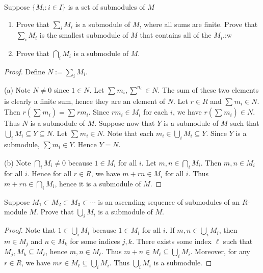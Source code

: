\documentclass[10pt,oneside,openany]{memoir}
\begin{document}
\begin{exercise}
	Suppose $\{M_i:i\in I\}$ is a set of submodules of $M$
	\mbox{}
	\begin{enumerate}[label = (\alph*),itemsep=1pt,topsep=3pt]
		\item Prove that $\sum_i M_i$ is a submodule of $M$, where all sums are finite. Prove that $\sum_i M_i$ is the smallest submodule of $M$ that contains all of the $M_i$.:w
		\item Prove that $\bigcap_i M_i$ is a submodule of $M$.
	\end{enumerate}
\end{exercise}
{\color{blue}

	\begin{proof}
		Define $N := \sum_{i}^{} M_i$.

		(a) Note $N \neq 0$ since $1 \in N$. Let $\sum_{}^{} m_i, \sum_{}^{n_i} \in N$. The sum of these two elements is clearly a finite sum, hence they are an element of $N$. Let $r \in R$ and $\sum_{}^{} m_i \in N$. Then $r \left( \sum_{}^{} m_i \right)  = \sum_{}^{} r m_i$. Since $rm_i \in M_i$ for each $i$, we have $r\left( \sum_{}^{} m_i \right) \in N$. Thus $N$ is a submodule of $M$. Suppose now that $Y$ is a submodule of $M$ such that $\bigcup_{i} M_i \subseteq Y \subseteq N.$ Let $\sum_{}^{}m_i \in N$. Note that each $m_i \in \bigcup_i M_i \subseteq Y$. Since $Y$ is a submodule, $\sum_{}^{} m_i \in Y$. Hence $Y = N$.

		(b) Note $\bigcap_i M_i \neq 0 $ because $1 \in M_i$ for all $i$. Let $m,n \in \bigcap_i M_i$. Then $m,n \in M_i$ for all $i$. Hence for all $r \in R$, we have $m+rn \in M_i$ for all $i$. Thus $m+rn \in \bigcap_i M_i$, hence it is a submodule of $M$.
	\end{proof}
}

\begin{exercise}
	Suppose $M_1\subset M_2\subset M_3\subset\cdots$ is an ascending sequence of submodules of an $R$-module $M$. Prove that $\bigcup_i M_i$ is a submodule of $M$.
\end{exercise}
{\color{blue}

	\begin{proof}
		Note that $1 \in \bigcup_{i}M_i$ because $1 \in M_i$ for all $i$. If $m,n \in \bigcup_i M_i$, then $m \in M_j$ and $n \in M_k$ for some indices $j,k$. There exists some index $\ell$ such that $M_j,M_k \subseteq M_\ell$, hence $m,n \in M_\ell$. Thus $m+n \in M_\ell \subseteq \bigcup_i M_i$. Moreover, for any $r \in R$, we have $mr \in M_\ell \subseteq \bigcup_i M_i$. Thus $\bigcup_i M_i$ is a submodule.
	\end{proof}
}
\end{document}
